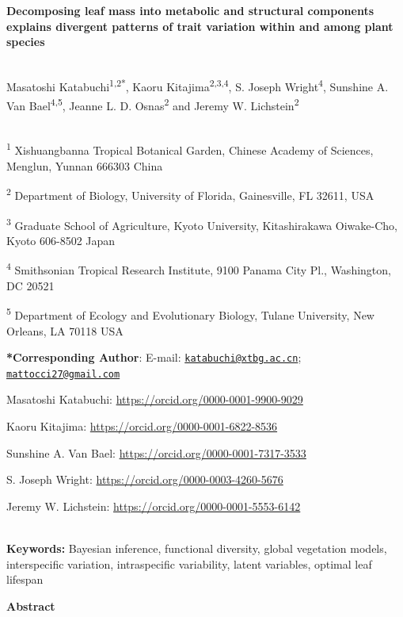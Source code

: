 \documentclass[
  12pt,
  letterpaper,
  DIV=11,
  numbers=noendperiod]{scrartcl}
\author{}
\date{}
\begin{document}
\textbf{Decomposing leaf mass into metabolic and structural components
explains divergent patterns of trait variation within and among plant
species}\\
\strut \\
Masatoshi Katabuchi\textsuperscript{1,2*}, Kaoru
Kitajima\textsuperscript{2,3,4}, S. Joseph Wright\textsuperscript{4},
Sunshine A. Van Bael\textsuperscript{4,5}, Jeanne L. D.
Osnas\textsuperscript{2} and Jeremy W. Lichstein\textsuperscript{2}\\
\strut \\
\textsuperscript{1} Xishuangbanna Tropical Botanical Garden, Chinese
Academy of Sciences, Menglun, Yunnan 666303 China

\textsuperscript{2} Department of Biology, University of Florida,
Gainesville, FL 32611, USA

\textsuperscript{3} Graduate School of Agriculture, Kyoto University,
Kitashirakawa Oiwake-Cho, Kyoto 606-8502 Japan

\textsuperscript{4} Smithsonian Tropical Research Institute, 9100 Panama
City Pl., Washington, DC 20521

\textsuperscript{5} Department of Ecology and Evolutionary Biology,
Tulane University, New Orleans, LA 70118 USA

\textbf{*Corresponding Author}: E-mail:
\href{mailto:katabuchi@xtbg.ac.cn}{\nolinkurl{katabuchi@xtbg.ac.cn}};
\href{mailto:mattocci27@gmail.com}{\nolinkurl{mattocci27@gmail.com}}

Masatoshi Katabuchi: \url{https://orcid.org/0000-0001-9900-9029}

Kaoru Kitajima: \url{https://orcid.org/0000-0001-6822-8536}

Sunshine A. Van Bael: \url{https://orcid.org/0000-0001-7317-3533}

S. Joseph Wright: \url{https://orcid.org/0000-0003-4260-5676}

Jeremy W. Lichstein: \url{https://orcid.org/0000-0001-5553-6142}\\
\strut \\
\textbf{Keywords:} Bayesian inference, functional diversity, global
vegetation models, interspecific variation, intraspecific variability,
latent variables, optimal leaf lifespan

\textbf{Abstract}
\end{document}
